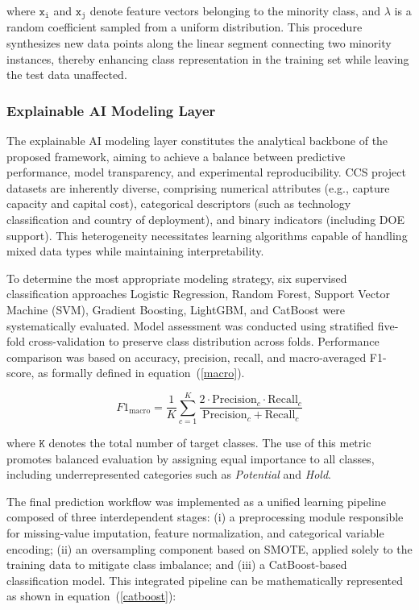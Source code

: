 \documentclass[conference]{IEEEtran}
\begin{document}
where $\mathtt{x_i}$ and $\mathtt{x_j}$ denote feature vectors belonging to the minority class, and $\mathtt{\lambda}$ is a random coefficient sampled from a uniform distribution. This procedure synthesizes new data points along the linear segment connecting two minority instances, thereby enhancing class representation in the training set while leaving the test data unaffected. 


\subsubsection{\textbf{Explainable AI Modeling Layer}}

The explainable AI modeling layer constitutes the analytical backbone of the proposed framework, aiming to achieve a balance between predictive performance, model transparency, and experimental reproducibility. CCS project datasets are inherently diverse, comprising numerical attributes (e.g., capture capacity and capital cost), categorical descriptors (such as technology classification and country of deployment), and binary indicators (including DOE support). This heterogeneity necessitates learning algorithms capable of handling mixed data types while maintaining interpretability.

To determine the most appropriate modeling strategy, six supervised classification approaches Logistic Regression, Random Forest, Support Vector Machine (SVM), Gradient Boosting, LightGBM, and CatBoost were systematically evaluated. Model assessment was conducted using stratified five-fold cross-validation to preserve class distribution across folds. Performance comparison was based on accuracy, precision, recall, and macro-averaged F1-score, as formally defined in equation~(\ref{macro}).


\begin{equation}
\label{macro}
    F1_{\text{macro}} = \frac{1}{K} \sum_{c=1}^{K} \frac{2 \cdot \text{Precision}_c \cdot \text{Recall}_c}{\text{Precision}_c + \text{Recall}_c}
\end{equation}

where $\mathtt{K}$ denotes the total number of target classes. The use of this metric promotes balanced evaluation by assigning equal importance to all classes, including underrepresented categories such as \textit{Potential} and \textit{Hold}. 

The final prediction workflow was implemented as a unified learning pipeline composed of three interdependent stages: (i) a preprocessing module responsible for missing-value imputation, feature normalization, and categorical variable encoding; (ii) an oversampling component based on SMOTE, applied solely to the training data to mitigate class imbalance; and (iii) a CatBoost-based classification model. This integrated pipeline can be mathematically represented as shown in equation~(\ref{catboost}):
\end{document}
